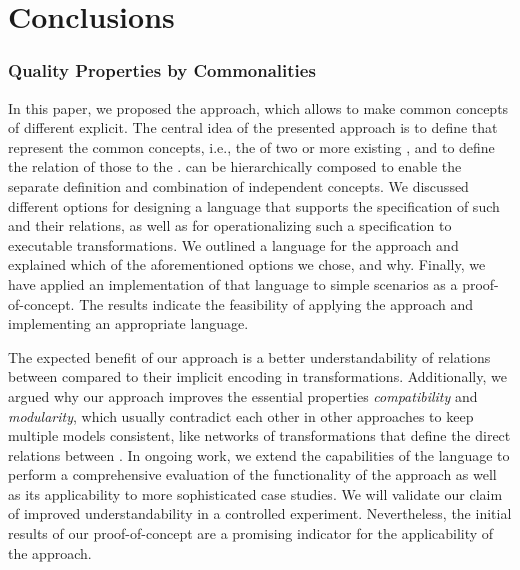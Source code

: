 \chapter{Conclusions }

\subsection{Quality Properties by Commonalities}

In this paper, we proposed the \commonalities approach, which allows to make common concepts of different \metamodels explicit.
The central idea of the presented approach 
is to define \emph{\conceptmetamodels} that represent the common concepts, i.e., the \commonalities of two or more existing \metamodels, and to define the relation of those \metamodels to the \conceptmetamodels.
\Conceptmetamodels can be hierarchically composed to enable the separate definition and combination of independent concepts.
We discussed different options for designing a language that supports the specification of such \commonalities and their relations, 
as well as for operationalizing such a specification to executable transformations.
We outlined a language for the \commonalities approach and explained %
which of the aforementioned options we chose, and why.
Finally, we have applied an implementation of that language to simple scenarios as a proof-of-concept.
The results indicate the feasibility of applying the \commonalities approach and implementing an appropriate language.

The expected benefit of our approach is a better understandability of relations between \metamodels compared to their implicit encoding in transformations.
Additionally, we argued why our approach improves the essential properties \emph{compatibility} and \emph{modularity}, which usually contradict each other in other approaches to keep multiple models consistent, like networks of transformations that define the direct relations between \metamodels.
In ongoing work, we extend the capabilities of the language to perform a comprehensive evaluation of the functionality of the approach as well as its applicability to more sophisticated case studies.
We will validate our claim of improved understandability in a controlled experiment.
Nevertheless, the initial results of our proof-of-concept are a promising indicator for the applicability of the \commonalities approach.
